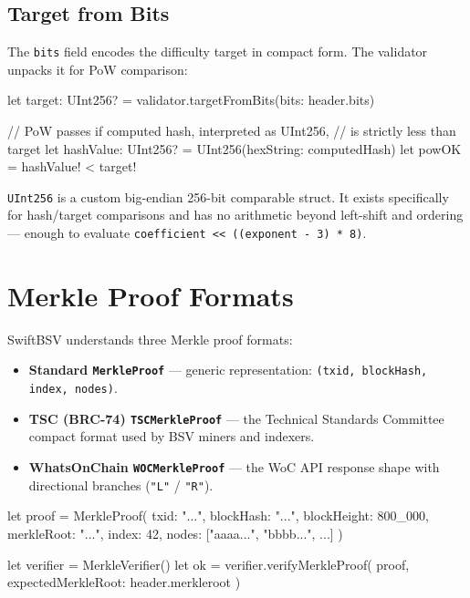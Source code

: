 \documentclass[a4paper, 11pt, openany]{book}
\begin{document}
\subsection{Target from Bits}

The \texttt{bits} field encodes the difficulty target in compact form. The validator unpacks it for PoW comparison:

\begin{forthbox}
let target: UInt256? = validator.targetFromBits(bits: header.bits)

// PoW passes if computed hash, interpreted as UInt256,
// is strictly less than target
let hashValue: UInt256? = UInt256(hexString: computedHash)
let powOK = hashValue! < target!
\end{forthbox}

\texttt{UInt256} is a custom big-endian 256-bit comparable struct. It exists specifically for hash/target comparisons and has no arithmetic beyond left-shift and ordering --- enough to evaluate \texttt{coefficient << ((exponent - 3) * 8)}.

\section{Merkle Proof Formats}

SwiftBSV understands three Merkle proof formats:

\begin{itemize}
\item \textbf{Standard \texttt{MerkleProof}} --- generic representation: \texttt{(txid, blockHash, index, nodes)}.
\item \textbf{TSC (BRC-74) \texttt{TSCMerkleProof}} --- the Technical Standards Committee compact format used by BSV miners and indexers.
\item \textbf{WhatsOnChain \texttt{WOCMerkleProof}} --- the WoC API response shape with directional branches (\texttt{"L"} / \texttt{"R"}).
\end{itemize}

\begin{forthbox}
let proof = MerkleProof(
    txid: "...",
    blockHash: "...",
    blockHeight: 800_000,
    merkleRoot: "...",
    index: 42,
    nodes: ["aaaa...", "bbbb...", ...]
)

let verifier = MerkleVerifier()
let ok = verifier.verifyMerkleProof(
    proof,
    expectedMerkleRoot: header.merkleroot
)
\end{forthbox}
\end{document}
